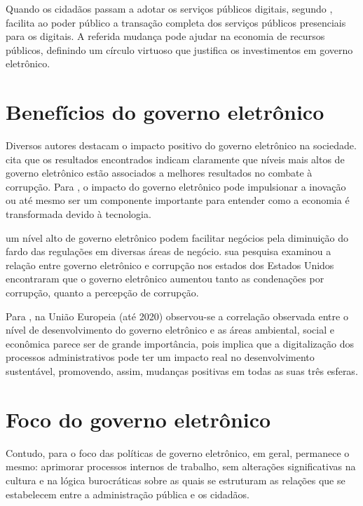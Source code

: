 Quando os cidadãos passam a adotar os serviços públicos digitais, segundo \cite{singh2007country}, facilita ao poder público a transação completa dos serviços públicos presenciais para os digitais. A referida mudança pode ajudar na economia de recursos públicos, definindo um círculo virtuoso que justifica os investimentos em governo eletrônico.

\section{Benefícios do governo eletrônico}

Diversos autores destacam o impacto positivo do governo eletrônico na sociedade.  \cite{martins2018war} cita que os resultados encontrados indicam claramente que níveis mais altos de governo eletrônico estão associados a melhores resultados no combate à corrupção. Para \cite{kotenok2020government}, o impacto do governo eletrônico pode impulsionar a inovação ou até mesmo ser um componente importante para entender como a economia é transformada   devido à tecnologia.

\cite{martins2022digital} um nível alto de governo eletrônico podem facilitar negócios pela   diminuição do fardo das regulações em diversas áreas de negócio. \cite{sugiarti2024effect} sua pesquisa examinou a relação entre governo eletrônico e corrupção nos   estados dos Estados Unidos encontraram que o governo eletrônico aumentou   tanto as condenações por corrupção, quanto a percepção de corrupção.

Para \cite{ziolo2022government}, na União Europeia (até 2020) observou-se a correlação observada entre o nível de desenvolvimento do governo eletrônico e as áreas ambiental, social e econômica parece ser de grande importância, pois implica que a digitalização dos processos administrativos pode ter um impacto real no desenvolvimento   sustentável, promovendo, assim, mudanças positivas em todas as suas três esferas.

\section{Foco do governo eletrônico}

Contudo, para \cite{de2020governo} o foco das políticas de governo eletrônico, em geral, permanece o mesmo: aprimorar processos internos de  trabalho, sem alterações significativas na cultura e na lógica burocráticas sobre as quais se estruturam as relações que se estabelecem entre a administração pública e os cidadãos.

